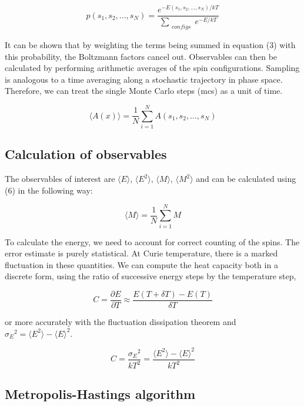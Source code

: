 \documentclass[a4paper]{article}
\begin{document}
\begin{equation}
 p(s_1, s_2, ..., s_N) = \frac{e^{-E(s_1, s_2, ..., s_N)/kT}}{\sum_{\substack{ configs}} e^{-E/kT}}
\end{equation}

It can be shown that by weighting the terms being summed in equation (3) with this probability, the Boltzmann factors cancel out. Observables can then be calculated by performing arithmetic averages of the spin configurations. Sampling is analogous to a time averaging along a stochastic trajectory in phase space. Therefore, we can treat the single Monte Carlo steps (mcs) as a unit of time. 

\begin{equation}
\langle A(x) \rangle = \frac{1}{N} \sum_{i=1}^{N} A(s_1, s_2, ..., s_N)
\end{equation}


\subsection{Calculation of observables}

The observables of interest are $\langle E \rangle$, $\langle E^2 \rangle$, $\langle M \rangle $, $\langle M^2 \rangle$ and can be calculated using (6) in the following way:

\begin{equation}
\langle M \rangle = \frac{1}{N} \sum_{i=1}^{N} M
\end{equation}

To calculate the energy, we need to account for correct counting of the spins. The error estimate is purely statistical. At Curie temperature, there is a marked fluctuation in these quantities. We can compute the heat capacity both in a discrete form, using the ratio of successive energy steps by the temperature step,

\begin{equation}
C = \frac{\partial E}{\partial T} \approx \frac{E(T+ \delta T)- E(T)}{\delta T} 
\end{equation}

or more accurately with the fluctuation dissipation theorem and ${\sigma_E}^2 = \langle E^2 \rangle - {\langle E \rangle}^2 $. 

\begin{equation}
 C   = \frac{{\sigma_E}^2}{kT^2} = \frac{\langle E^2 \rangle - {\langle E \rangle}^2}{kT^2} 
\end{equation}


\subsection{Metropolis-Hastings algorithm}
\end{document}
